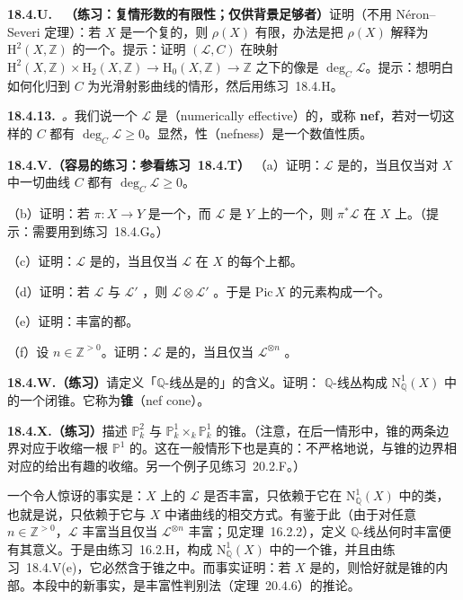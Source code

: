 \textbf{18.4.U.}\ \extrahard\ \textbf{（练习：复情形\trPicard{}数的有限性；仅供背景足够者）}\quad 证明（不用 N\'eron--Severi 定理）：若 $X$ 是一个复的\trProper{}\trVariety，则 $\rho(X)$ 有限，办法是把 $\rho(X)$ 解释为 $\mathrm{H}^2(X,\mathbb{Z})$ 的一个\trSubquotient。提示：证明 $(\mathscr{L},C)$ 在映射 $\mathrm{H}^2(X,\mathbb{Z})\times\mathrm{H}_2(X,\mathbb{Z})\to\mathrm{H}_0(X,\mathbb{Z})\to\mathbb{Z}$ 之下的像是 $\deg_C\mathscr{L}$。提示：想明白如何化归到 $C$ 为光滑射影曲线的情形，然后用\mbox{练习~18.4.H}。

\textbf{18.4.13.}\ \emph{\trhDefinition。}\quad 我们说一个\trInvertibleSheaf{} $\mathscr{L}$ 是\textbf{\trNef}（numerically effective）的，或称 \textbf{nef}，若对一切这样的 $C$ 都有 $\deg_C\mathscr{L}\ge 0$。显然，\trNef{}性（nefness）是一个数值性质。

\textbf{18.4.V.（容易的练习：参看\mbox{练习~18.4.T}）}\quad
（a）证明：$\mathscr{L}$ 是\trNef{}的，当且仅当对 $X$ 中一切\emph{\trIntegral}曲线 $C$ 都有 $\deg_C\mathscr{L}\ge 0$。

（b）证明：若 $\pi\colon X\to Y$ 是一个\trProper\trMorphism，而 $\mathscr{L}$ 是 $Y$ 上的一个\trNef\trInvertibleSheaf，则 $\pi^*\mathscr{L}$ 在 $X$ 上\trNef。（提示：需要用到\mbox{练习~18.4.G}。）

（c）证明：$\mathscr{L}$ 是\trNef{}的，当且仅当 $\mathscr{L}$ 在 $X$ 的每个\trIrreducibleComponent{}上都\trNef。

（d）证明：若 $\mathscr{L}$ 与 $\mathscr{L}'$ \trNef，则 $\mathscr{L}\otimes\mathscr{L}'$ \trNef。于是 $\mathrm{Pic}\,X$ 的\trNef{}元素构成一个\trAbelianSemigroup。

（e）证明：丰富的\trInvertibleSheaf{}都\trNef。

（f）设 $n\in\mathbb{Z}^{>0}$。证明：$\mathscr{L}$ 是\trNef{}的，当且仅当 $\mathscr{L}^{\otimes n}$ \trNef。

\textbf{18.4.W.（练习）}\quad 请定义「$\mathbb{Q}$-线丛是\trNef{}的」的含义。证明：\trNef{} $\mathbb{Q}$-线丛构成 $\mathrm{N}^1_{\mathbb{Q}}(X)$ 中的一个闭锥。它称为\textbf{\trNef{}锥}（nef cone）。

\textbf{18.4.X.（练习）}\quad 描述 $\mathbb{P}^2_k$ 与 $\mathbb{P}^1_k\times_k\mathbb{P}^1_k$ 的\trNef{}锥。（注意，在后一情形中，锥的两条边界对应于收缩一根 $\mathbb{P}^1$ 的\trLinearSystem。这在一般情形下也是真的：不严格地说，与锥的边界相对应的\trLinearSystem{}给出有趣的收缩。另一个例子见\mbox{练习~20.2.F}。）

一个令人惊讶的事实是：$X$ 上的\trInvertibleSheaf{} $\mathscr{L}$ 是否丰富，只依赖于它在 $\mathrm{N}^1_{\mathbb{Q}}(X)$ 中的类，也就是说，只依赖于它与 $X$ 中诸曲线的相交方式。有鉴于此（由于对任意 $n\in\mathbb{Z}^{>0}$，$\mathscr{L}$ 丰富当且仅当 $\mathscr{L}^{\otimes n}$ 丰富；见\mbox{定理~16.2.2}），定义 $\mathbb{Q}$-线丛何时丰富便有其意义。于是由\mbox{练习~16.2.H}，\trAmple{}\trDivisor{}构成 $\mathrm{N}^1_{\mathbb{Q}}(X)$ 中的一个锥，并且由\mbox{练习~18.4.V(e)}，它必然含于\trNef{}锥之中。而事实证明：若 $X$ 是\trProjective{}的，则\trAmple{}\trDivisor{}恰好就是\trNef{}锥的内部。本段中的新事实，是\trKleiman{}丰富性判别法（\mbox{定理~20.4.6}）的推论。
